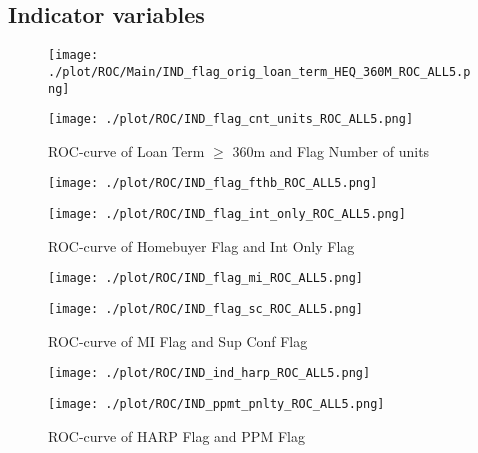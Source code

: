 \subsection{Indicator variables}

\begin{figure}[H]
\begin{minipage}{.5\textwidth}
	\centering
	\texttt{[image: ./plot/ROC/Main/IND\_flag\_orig\_loan\_term\_HEQ\_360M\_ROC\_ALL5.png]}
\end{minipage}%
\begin{minipage}{.5\textwidth}
	\centering
	\texttt{[image: ./plot/ROC/IND\_flag\_cnt\_units\_ROC\_ALL5.png]}
\end{minipage}
    \caption{ROC-curve of Loan Term $\geq$ 360m and Flag Number of units}
\end{figure}

\begin{figure}[H]
\begin{minipage}{.5\textwidth}
	\centering
	\texttt{[image: ./plot/ROC/IND\_flag\_fthb\_ROC\_ALL5.png]}
\end{minipage}%
\begin{minipage}{.5\textwidth}
	\centering
	\texttt{[image: ./plot/ROC/IND\_flag\_int\_only\_ROC\_ALL5.png]}
\end{minipage}
    \caption{ROC-curve of Homebuyer Flag and Int Only Flag}
\end{figure}

\begin{figure}[H]
\begin{minipage}{.5\textwidth}
	\centering
	\texttt{[image: ./plot/ROC/IND\_flag\_mi\_ROC\_ALL5.png]}
\end{minipage}%
\begin{minipage}{.5\textwidth}
	\centering
	\texttt{[image: ./plot/ROC/IND\_flag\_sc\_ROC\_ALL5.png]}
\end{minipage}
    \caption{ROC-curve of MI Flag and Sup Conf Flag}
\end{figure}

\begin{figure}[H]
\begin{minipage}{.5\textwidth}
	\centering
	\texttt{[image: ./plot/ROC/IND\_ind\_harp\_ROC\_ALL5.png]}
\end{minipage}%
\begin{minipage}{.5\textwidth}
	\centering
	\texttt{[image: ./plot/ROC/IND\_ppmt\_pnlty\_ROC\_ALL5.png]}
\end{minipage}
    \caption{ROC-curve of HARP Flag and PPM Flag}
\end{figure}

